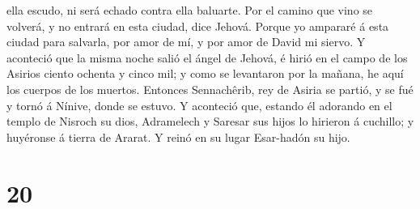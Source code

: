 ella escudo, ni será echado contra ella baluarte.  Por el
camino que vino se volverá, y no entrará en esta ciudad, dice Jehová.
 Porque yo ampararé á esta ciudad para salvarla, por amor
de mí, y por amor de David mi siervo.  Y aconteció que la
misma noche salió el ángel de Jehová, é hirió en el campo de los Asirios
ciento ochenta y cinco mil; y como se levantaron por la mañana, he aquí
los cuerpos de los muertos.  Entonces Sennachêrib, rey de
Asiria se partió, y se fué y tornó á Nínive, donde se estuvo.
 Y aconteció que, estando él adorando en el templo de
Nisroch su dios, Adramelech y Saresar sus hijos lo hirieron á cuchillo;
y huyéronse á tierra de Ararat. Y reinó en su lugar Esar-hadón su hijo.

\hypertarget{section-19}{%
\section{20}\label{section-19}}

